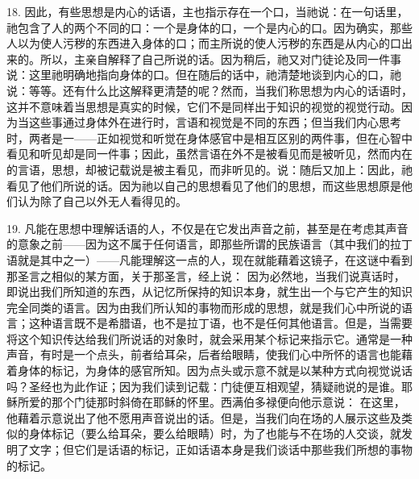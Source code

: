 18. 因此，有些思想是内心的话语，主也指示存在一个口，当祂说：在一句话里，祂包含了人的两个不同的口：一个是身体的口，一个是内心的口。因为确实，那些人以为使人污秽的东西进入身体的口；而主所说的使人污秽的东西是从内心的口出来的。所以，主亲自解释了自己所说的话。因为稍后，祂又对门徒论及同一件事说：这里祂明确地指向身体的口。但在随后的话中，祂清楚地谈到内心的口，祂说：等等。还有什么比这解释更清楚的呢？然而，当我们称思想为内心的话语时，这并不意味着当思想是真实的时候，它们不是同样出于知识的视觉的视觉行动。因为当这些事通过身体外在进行时，言语和视觉是不同的东西；但当我们内心思考时，两者是一——正如视觉和听觉在身体感官中是相互区别的两件事，但在心智中看见和听见却是同一件事；因此，虽然言语在外不是被看见而是被听见，然而内在的言语，思想，却被记载说是被主看见，而非听见的。说：随后又加上：因此，祂看见了他们所说的话。因为祂以自己的思想看见了他们的思想，而这些思想原是他们认为除了自己以外无人看得见的。\par

19. 凡能在思想中理解话语的人，不仅是在它发出声音之前，甚至是在考虑其声音的意象之前——因为这不属于任何语言，即那些所谓的民族语言（其中我们的拉丁语就是其中之一）——凡能理解这一点的人，现在就能藉着这镜子，在这谜中看到那圣言之相似的某方面，关于那圣言，经上说： 因为必然地，当我们说真话时，即说出我们所知道的东西，从记忆所保持的知识本身，就生出一个与它产生的知识完全同类的语言。因为由我们所认知的事物而形成的思想，就是我们心中所说的语言；这种语言既不是希腊语，也不是拉丁语，也不是任何其他语言。但是，当需要将这个知识传达给我们所说话的对象时，就会采用某个标记来指示它。通常是一种声音，有时是一个点头，前者给耳朵，后者给眼睛，使我们心中所怀的语言也能藉着身体的标记，为身体的感官所知。因为点头或示意不就是以某种方式向视觉说话吗？圣经也为此作证；因为我们读到记载：门徒便互相观望，猜疑祂说的是谁。耶稣所爱的那个门徒那时斜倚在耶稣的怀里。西满伯多禄便向他示意说： 在这里，他藉着示意说出了他不愿用声音说出的话。但是，当我们向在场的人展示这些及类似的身体标记（要么给耳朵，要么给眼睛）时，为了也能与不在场的人交谈，就发明了文字；但它们是话语的标记，正如话语本身是我们谈话中那些我们所想的事物的标记。\par

